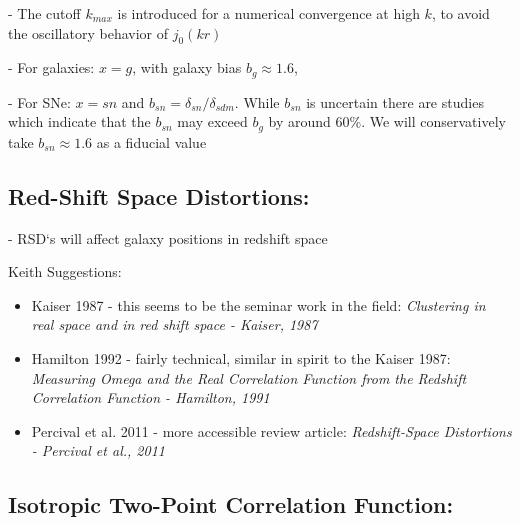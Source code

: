 \documentclass{article}
\begin{document}
- The cutoff $k_{max}$ is introduced for a numerical convergence at high $k$, to avoid the oscillatory behavior of $j_0(kr)$

- For galaxies: $x = g$, with galaxy bias $b_g \approx 1.6$,

- For SNe: $x = sn$ and $b_{sn} = \delta_{sn}/ \delta_{sdm}$. While $b_{sn}$ is uncertain there are studies which indicate that the $b_{sn}$ may exceed $b_{g}$ by around 60\%. We will conservatively take $b_{sn} \approx 1.6$ as a fiducial value

\subsection{Red-Shift Space Distortions:}

- RSD`s will affect galaxy positions in redshift space

Keith Suggestions: 

\begin{itemize}
  \item Kaiser 1987 - this seems to be the seminar work in the field: \em{Clustering in real space and in red shift space - Kaiser, 1987}
  
  \item Hamilton 1992 - fairly technical, similar in spirit to the Kaiser 1987: \em{Measuring Omega and the Real Correlation Function from the Redshift Correlation Function - Hamilton, 1991}
  
  \item Percival et al. 2011 - more accessible review article: \em{Redshift-Space Distortions - Percival et al., 2011}
  
\end{itemize}

\subsection{Isotropic Two-Point Correlation Function:}
\end{document}
